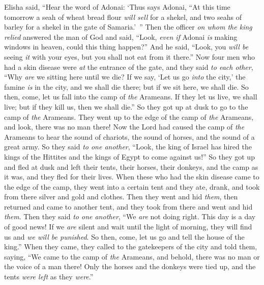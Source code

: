 \begin{biblechapter} %
 Elisha said, “Hear the word of Adonai: ‘Thus says Adonai, “At this time tomorrow a seah of wheat bread flour \textit{will sell} for a shekel, and two seahs of barley for a shekel in the gate of Samaria.’ ”
\verse Then the officer \textit{on whom the king relied} answered the man of God and said, “Look, \textit{even if} Adonai \textit{is} making windows in heaven, could this thing happen?” And he said, “Look, you \textit{will be} seeing \textit{it} with your eyes, but you shall not eat from it there.”
 Now four men who had a skin disease were \textit{at} the entrance of the gate, and they said \textit{to each other}, “Why \textit{are} we sitting here until we die?
\verse If we say, ‘Let us go \textit{into} the city,’ the famine \textit{is} in the city, and we shall die there; but if we sit here, we shall die. So then, come, let us fall into the camp of \textit{the} Arameans. If they let us live, we shall live; but if they kill us, then we shall die.”
\verse So they got up at dusk to go to the camp of \textit{the} Arameans. They went up to the edge of the camp of \textit{the} Arameans, and look, there was no man there!
\verse Now the Lord had caused the camp of \textit{the} Arameans to hear the sound of chariots, the sound of horses, and the sound of a great army. So they said \textit{to one another}, “Look, the king of Israel has hired the kings of the Hittites and the kings of Egypt to come against us!”
\verse So they got up and fled at dusk and left their tents, their horses, their donkeys, and the camp as it was, and they fled for their lives.
\verse When these who had the skin disease came to the edge of the camp, they went into a certain tent and they ate, drank, and took from there silver and gold and clothes. Then they went and hid \textit{them}, then returned and came to another tent, and they took from there and went and hid \textit{them}.
\verse Then they said \textit{to one another}, “We \textit{are} not doing right. This day is a day of good news! If we \textit{are} silent and wait until the light of morning, they will find us and \textit{we will be punished}. So then, come, let us go and tell the house of the king.”
\verse When they came, they called to the gatekeepers of the city and told them, saying, “We came to the camp of \textit{the} Arameans, and behold, there was no man or the voice of a man there! Only the horses and the donkeys were tied up, and the tents \textit{were left} as they \textit{were}.”

\end{biblechapter}
